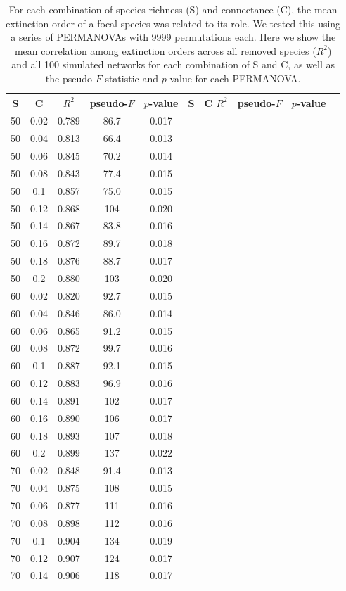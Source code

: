 \documentclass[12pt]{article}
\begin{document}
	\begin{table}[h!]
		\caption{For each combination of species richness (S) and connectance (C), the mean extinction order of a focal species was related to its role. We tested this using a series of PERMANOVAs with 9999 permutations each. Here we show the mean correlation among extinction orders across all removed species ($R^2$) and all 100 simulated networks for each combination of S and C, as well as the pseudo-$F$ statistic and $p$-value for each PERMANOVA.}
		\label{permtable}
		\begin{tabular}{c c | c | c c ||c c | c | c c |}
			S	&	C	&	$R^2$	&	pseudo-$F$	&	$p$-value	&	S	&	C	$R^2$	&	pseudo-$F$	&	$p$-value\\ 
			\hline
			50&0.02&0.789&86.7&0.017\\ 
			50&0.04&0.813&66.4&0.013\\ 
			50&0.06&0.845&70.2&0.014\\ 
			50&0.08&0.843&77.4&0.015\\ 
			50&0.1&0.857&75.0&0.015\\ 
			50&0.12&0.868&104&0.020\\ 
			50&0.14&0.867&83.8&0.016\\ 
			50&0.16&0.872&89.7&0.018\\ 
			50&0.18&0.876&88.7&0.017\\ 
			50&0.2&0.880&103&0.020\\ 
			60&0.02&0.820&92.7&0.015\\ 
			60&0.04&0.846&86.0&0.014\\ 
			60&0.06&0.865&91.2&0.015\\ 
			60&0.08&0.872&99.7&0.016\\ 
			60&0.1&0.887&92.1&0.015\\ 
			60&0.12&0.883&96.9&0.016\\ 
			60&0.14&0.891&102&0.017\\ 
			60&0.16&0.890&106&0.017\\ 
			60&0.18&0.893&107&0.018\\ 
			60&0.2&0.899&137&0.022\\ 
			70&0.02&0.848&91.4&0.013\\ 
			70&0.04&0.875&108&0.015\\ 
			70&0.06&0.877&111&0.016\\ 
			70&0.08&0.898&112&0.016\\ 
			70&0.1&0.904&134&0.019\\ 
			70&0.12&0.907&124&0.017\\ 
			70&0.14&0.906&118&0.017\\ 

\end{tabular}
\end{table}
\end{document}
